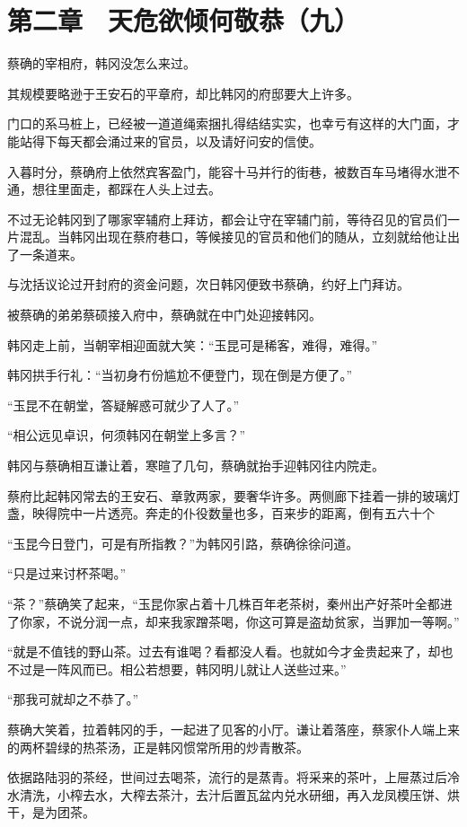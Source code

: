 \section{第二章　天危欲倾何敬恭（九）}

蔡确的宰相府，韩冈没怎么来过。

其规模要略逊于王安石的平章府，却比韩冈的府邸要大上许多。

门口的系马桩上，已经被一道道绳索捆扎得结结实实，也幸亏有这样的大门面，才能站得下每天都会涌过来的官员，以及请好问安的信使。

入暮时分，蔡确府上依然宾客盈门，能容十马并行的街巷，被数百车马堵得水泄不通，想往里面走，都踩在人头上过去。

不过无论韩冈到了哪家宰辅府上拜访，都会让守在宰辅门前，等待召见的官员们一片混乱。当韩冈出现在蔡府巷口，等候接见的官员和他们的随从，立刻就给他让出了一条道来。

与沈括议论过开封府的资金问题，次日韩冈便致书蔡确，约好上门拜访。

被蔡确的弟弟蔡硕接入府中，蔡确就在中门处迎接韩冈。

韩冈走上前，当朝宰相迎面就大笑：“玉昆可是稀客，难得，难得。”

韩冈拱手行礼：“当初身冇份尴尬不便登门，现在倒是方便了。”

“玉昆不在朝堂，答疑解惑可就少了人了。”

“相公远见卓识，何须韩冈在朝堂上多言？”

韩冈与蔡确相互谦让着，寒暄了几句，蔡确就抬手迎韩冈往内院走。

蔡府比起韩冈常去的王安石、章敦两家，要奢华许多。两侧廊下挂着一排的玻璃灯盏，映得院中一片透亮。奔走的仆役数量也多，百来步的距离，倒有五六十个

“玉昆今日登门，可是有所指教？”为韩冈引路，蔡确徐徐问道。

“只是过来讨杯茶喝。”

“茶？”蔡确笑了起来，“玉昆你家占着十几株百年老茶树，秦州出产好茶叶全都进了你家，不说分润一点，却来我家蹭茶喝，你这可算是盗劫贫家，当罪加一等啊。”

“就是不值钱的野山茶。过去有谁喝？看都没人看。也就如今才金贵起来了，却也不过是一阵风而已。相公若想要，韩冈明儿就让人送些过来。”

“那我可就却之不恭了。”

蔡确大笑着，拉着韩冈的手，一起进了见客的小厅。谦让着落座，蔡家仆人端上来的两杯碧绿的热茶汤，正是韩冈惯常所用的炒青散茶。

依据路陆羽的茶经，世间过去喝茶，流行的是蒸青。将采来的茶叶，上屉蒸过后冷水清洗，小榨去水，大榨去茶汁，去汁后置瓦盆内兑水研细，再入龙凤模压饼、烘干，是为团茶。

